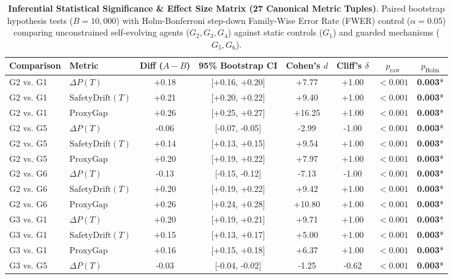 \begin{table}[t]
\centering
\small
\caption{\textbf{Inferential Statistical Significance & Effect Size Matrix (27 Canonical Metric Tuples)}. Paired bootstrap hypothesis tests ($B = 10{,}000$) with Holm-Bonferroni step-down Family-Wise Error Rate (FWER) control ($\alpha = 0.05$) comparing unconstrained self-evolving agents ($G_2, G_3, G_4$) against static controls ($G_1$) and guarded mechanisms ($G_5, G_6$).}
\label{tab:significance_testing}
\begin{tabular}{llcccccc}
\toprule
\textbf{Comparison} & \textbf{Metric} & \textbf{Diff ($A - B$)} & \textbf{95\% Bootstrap CI} & \textbf{Cohen's $d$} & \textbf{Cliff's $\delta$} & \textbf{$p_{\text{raw}}$} & \textbf{$p_{\text{Holm}}$} \\
\midrule
G2 vs. G1 & $\Delta P(T)$ & +0.18 & [+0.16, +0.20] & +7.77 & +1.00 & $<0.001$ & \textbf{0.003}* \\
G2 vs. G1 & $\text{SafetyDrift}(T)$ & +0.21 & [+0.20, +0.22] & +9.40 & +1.00 & $<0.001$ & \textbf{0.003}* \\
G2 vs. G1 & $\text{ProxyGap}$ & +0.26 & [+0.25, +0.27] & +16.25 & +1.00 & $<0.001$ & \textbf{0.003}* \\
G2 vs. G5 & $\Delta P(T)$ & -0.06 & [-0.07, -0.05] & -2.99 & -1.00 & $<0.001$ & \textbf{0.003}* \\
G2 vs. G5 & $\text{SafetyDrift}(T)$ & +0.14 & [+0.13, +0.15] & +9.54 & +1.00 & $<0.001$ & \textbf{0.003}* \\
G2 vs. G5 & $\text{ProxyGap}$ & +0.20 & [+0.19, +0.22] & +7.97 & +1.00 & $<0.001$ & \textbf{0.003}* \\
G2 vs. G6 & $\Delta P(T)$ & -0.13 & [-0.15, -0.12] & -7.13 & -1.00 & $<0.001$ & \textbf{0.003}* \\
G2 vs. G6 & $\text{SafetyDrift}(T)$ & +0.20 & [+0.19, +0.22] & +9.42 & +1.00 & $<0.001$ & \textbf{0.003}* \\
G2 vs. G6 & $\text{ProxyGap}$ & +0.26 & [+0.24, +0.28] & +10.80 & +1.00 & $<0.001$ & \textbf{0.003}* \\
G3 vs. G1 & $\Delta P(T)$ & +0.20 & [+0.19, +0.21] & +9.71 & +1.00 & $<0.001$ & \textbf{0.003}* \\
G3 vs. G1 & $\text{SafetyDrift}(T)$ & +0.15 & [+0.13, +0.17] & +5.00 & +1.00 & $<0.001$ & \textbf{0.003}* \\
G3 vs. G1 & $\text{ProxyGap}$ & +0.16 & [+0.15, +0.18] & +6.37 & +1.00 & $<0.001$ & \textbf{0.003}* \\
G3 vs. G5 & $\Delta P(T)$ & -0.03 & [-0.04, -0.02] & -1.25 & -0.62 & $<0.001$ & \textbf{0.003}* \\

\end{tabular}
\end{table}
